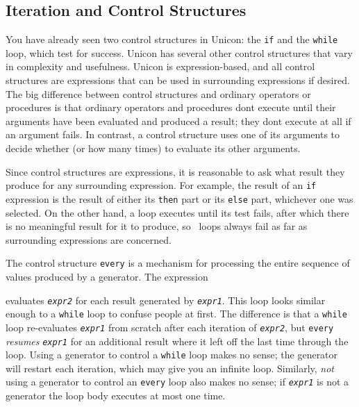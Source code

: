 \subsection{Iteration and Control Structures}

You have already seen two control structures in Unicon: the \texttt{if}
and the \texttt{while} loop, which test for success.
Unicon has several other control structures that vary in complexity and
usefulness. Unicon is expression-based, and all control structures are
expressions that can be used in surrounding expressions if desired. The
big difference between control structures and ordinary operators or
procedures is that ordinary operators and procedures
don{\textquotesingle}t execute until their arguments have been
evaluated and produced a result; they don{\textquotesingle}t execute at
all if an argument fails. In contrast, a control structure uses one of
its arguments to decide whether (or how many times) to evaluate its
other arguments.

Since control structures are expressions, it is reasonable to ask what
result they produce for any surrounding expression. For example, the
result of an \texttt{if} expression is the result of either its
\texttt{then} part or its \texttt{else} part, whichever one was
selected. On the other hand, a loop executes until its test fails,
after which there is no meaningful result for it to produce, so \ loops
always fail as far as surrounding expressions are concerned.

The control structure
\texttt{every} is a mechanism for processing the entire
sequence of values produced by a generator. The expression 


\noindent
evaluates \texttt{\textit{expr2}} for each result generated by
\texttt{\textit{expr1}}. This loop looks similar enough to a
\texttt{while} loop to confuse people at first. The difference is that
a \texttt{while} loop re-evaluates \texttt{\textit{expr1}} from scratch
after each iteration of \texttt{\textit{expr2}}, but \texttt{every}
\textit{resumes} \texttt{\textit{expr1}} for an additional result where
it left off the last time through the loop. Using a generator to
control a \texttt{while} loop makes no sense; the generator will
restart each iteration, which may give you an infinite loop. Similarly,
\textit{not} using a generator to control an \texttt{every} loop also
makes no sense; if \texttt{\textit{expr1}} is not a generator the loop
body executes at most one time.

